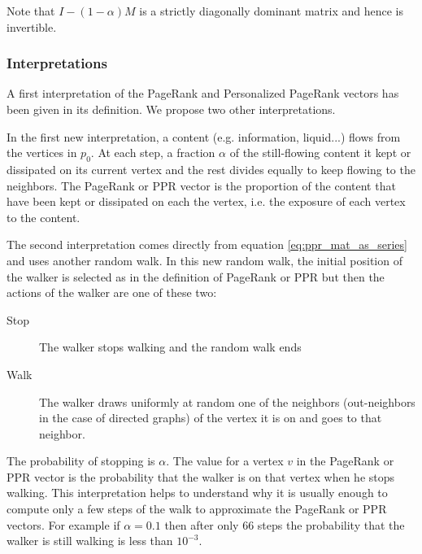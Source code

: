Note that $I - (1-\alpha)M$ is a strictly diagonally dominant matrix and hence is invertible.

\subsubsection{Interpretations}
A first interpretation of the PageRank and Personalized PageRank vectors has been given in its definition. We propose two other interpretations.

In the first new interpretation, a content (e.g. information, liquid...) flows from the vertices in $p_0$. At each step, a fraction $\alpha$ of the still-flowing content it kept or dissipated on its current vertex and the rest divides equally to keep flowing to the neighbors. The PageRank or PPR vector is the proportion of the content that have been kept or dissipated on each the vertex, i.e. the exposure of each vertex to the content.

The second interpretation comes directly from equation \ref{eq:ppr_mat_as_series} and uses another random walk. In this new random walk, the initial position of the walker is selected as in the definition of PageRank or PPR but then the actions of the walker are one of these two:
\begin{description}
    \item[Stop] The walker stops walking and the random walk ends
    \item[Walk] The walker draws uniformly at random one of the neighbors (out-neighbors in the case of directed graphs) of the vertex it is on and goes to that neighbor.
\end{description}

The probability of stopping is $\alpha$. The value for a vertex $v$ in the PageRank or PPR vector is the probability that the walker is on that vertex when he stops walking. This interpretation helps to understand why it is usually enough to compute only a few steps of the walk to approximate the PageRank or PPR vectors. For example if $\alpha = 0.1$ then after only $66$ steps the probability that the walker is still walking is less than $10^{-3}$.

